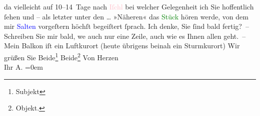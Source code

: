                   da{\geminationn} vielleicht auf 10–14 Tage nach \textcolor{pink}{Iſchl}{}\ledrightnote{\textcolor{pink}{Bad Ischl}} bei welcher Gelegenheit ich Sie hoffentlich ſehen und –
               als letzter unter den {\dots} »Näheren« das \textcolor{green}{Stück}{} hören werde, von dem mir \textcolor{blue}{Salten}{}\ledrightnote{\textcolor{blue}{Felix Salten}} vorgeſtern höchſt begeiſtert ſprach. Ich denke, {\pb}Sie ſind bald fertig? –\pend
           \pstart
           Schreiben Sie mir bald, we{\geminationn} auch nur eine Zeile, auch
               wie es Ihnen allen geht. –\pend
           \pstart
           Mein Balkon iſt ein Luftkurort (heute übrigens beinah ein Sturmkurort)\pend
           \pstart
           Wir grüßen Sie Beide\footnote{\noindent{}Subjekt} Beide\footnote{\noindent{}Objekt.}\pend
           \pstart
           Von Herzen{\\[\baselineskip]}Ihr \spacefill\mbox{A.}\pend
           \leftskip=0em{}\endnumbering{}  
      